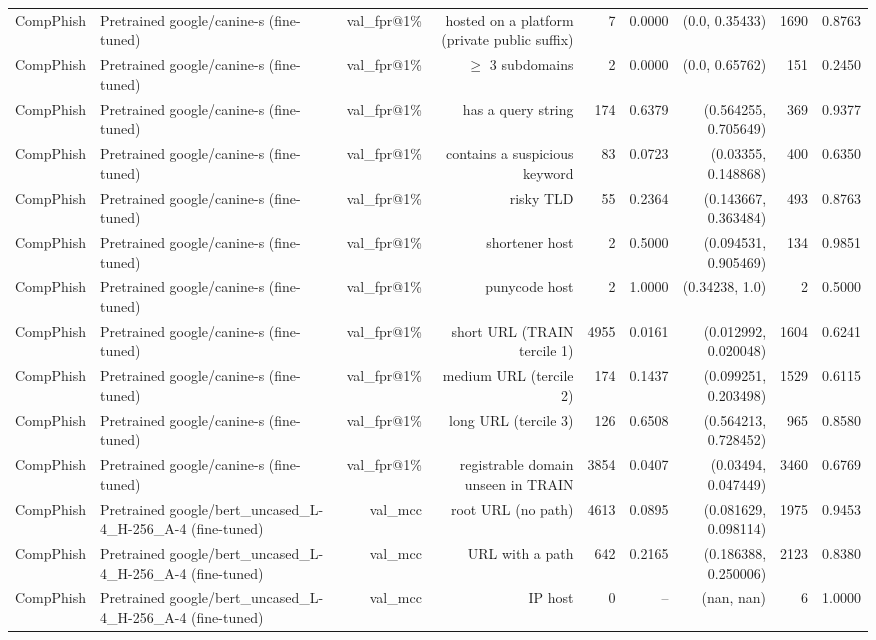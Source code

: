 \begin{table}[t]
\begin{tabular}{llrrrrrrr}
CompPhish & Pretrained google/canine-s (fine-tuned) & val\_fpr@1\% & hosted on a platform (private public suffix) & 7 & 0.0000 & (0.0, 0.35433) & 1690 & 0.8763 \\
CompPhish & Pretrained google/canine-s (fine-tuned) & val\_fpr@1\% & $\geq$ 3 subdomains & 2 & 0.0000 & (0.0, 0.65762) & 151 & 0.2450 \\
CompPhish & Pretrained google/canine-s (fine-tuned) & val\_fpr@1\% & has a query string & 174 & 0.6379 & (0.564255, 0.705649) & 369 & 0.9377 \\
CompPhish & Pretrained google/canine-s (fine-tuned) & val\_fpr@1\% & contains a suspicious keyword & 83 & 0.0723 & (0.03355, 0.148868) & 400 & 0.6350 \\
CompPhish & Pretrained google/canine-s (fine-tuned) & val\_fpr@1\% & risky TLD & 55 & 0.2364 & (0.143667, 0.363484) & 493 & 0.8763 \\
CompPhish & Pretrained google/canine-s (fine-tuned) & val\_fpr@1\% & shortener host & 2 & 0.5000 & (0.094531, 0.905469) & 134 & 0.9851 \\
CompPhish & Pretrained google/canine-s (fine-tuned) & val\_fpr@1\% & punycode host & 2 & 1.0000 & (0.34238, 1.0) & 2 & 0.5000 \\
CompPhish & Pretrained google/canine-s (fine-tuned) & val\_fpr@1\% & short URL (TRAIN tercile 1) & 4955 & 0.0161 & (0.012992, 0.020048) & 1604 & 0.6241 \\
CompPhish & Pretrained google/canine-s (fine-tuned) & val\_fpr@1\% & medium URL (tercile 2) & 174 & 0.1437 & (0.099251, 0.203498) & 1529 & 0.6115 \\
CompPhish & Pretrained google/canine-s (fine-tuned) & val\_fpr@1\% & long URL (tercile 3) & 126 & 0.6508 & (0.564213, 0.728452) & 965 & 0.8580 \\
CompPhish & Pretrained google/canine-s (fine-tuned) & val\_fpr@1\% & registrable domain unseen in TRAIN & 3854 & 0.0407 & (0.03494, 0.047449) & 3460 & 0.6769 \\
CompPhish & Pretrained google/bert\_uncased\_L-4\_H-256\_A-4 (fine-tuned) & val\_mcc & root URL (no path) & 4613 & 0.0895 & (0.081629, 0.098114) & 1975 & 0.9453 \\
CompPhish & Pretrained google/bert\_uncased\_L-4\_H-256\_A-4 (fine-tuned) & val\_mcc & URL with a path & 642 & 0.2165 & (0.186388, 0.250006) & 2123 & 0.8380 \\
CompPhish & Pretrained google/bert\_uncased\_L-4\_H-256\_A-4 (fine-tuned) & val\_mcc & IP host & 0 & -- & (nan, nan) & 6 & 1.0000 \\

\end{tabular}
\end{table}
